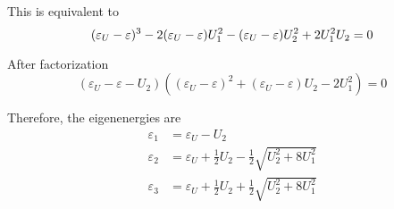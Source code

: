 \documentclass{article}
\begin{document}
This is equivalent to
\begin{equation*}
(\varepsilon_U-\varepsilon)^3-2(\varepsilon_U-\varepsilon)U_1^2-(\varepsilon_U-\varepsilon)U_2^2+2U_1^2U_2=0\\
\end{equation*}

After factorization
\begin{equation*}
(\varepsilon_U-\varepsilon-U_2)\left((\varepsilon_U-\varepsilon)^2+(\varepsilon_U-\varepsilon)U_2-2U_1^2\right)=0
\end{equation*}

Therefore, the eigenenergies are
\begin{align*}
\varepsilon_1&=\varepsilon_U-U_2\\
\varepsilon_2&=\varepsilon_U+\frac{1}{2}U_2-\frac{1}{2}\sqrt{U_2^2+8U_1^2}\\
\varepsilon_3&=\varepsilon_U+\frac{1}{2}U_2+\frac{1}{2}\sqrt{U_2^2+8U_1^2}\\
\end{align*}
\end{document}
